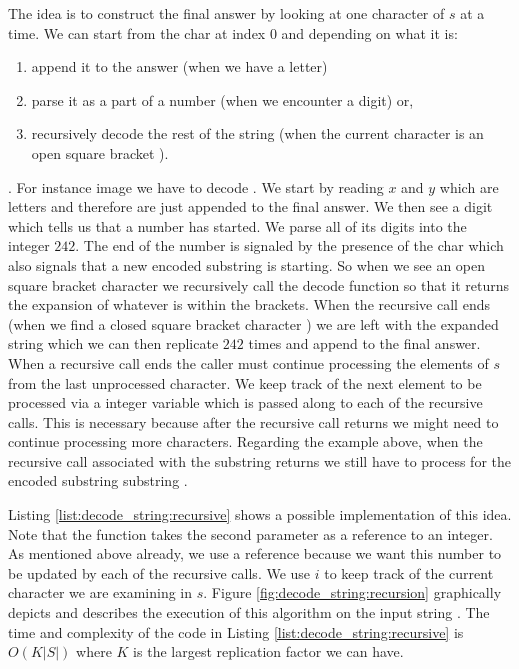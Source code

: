 The idea is to construct the final answer by looking at one character of $s$ at a time. We can start
from  the char at index $0$ and depending on what it is:
\begin{enumerate}
	\item append it to the answer (when we have a letter)
	\item parse it as a part of a number (when we encounter a digit) or,
	\item recursively decode the rest of the string (when the current character is an open square
		  bracket \inline{'['}).
\end{enumerate}.
For instance image we have to decode .
We start by reading $x$ and $y$ which are letters and therefore are
just appended to the final answer.
We then see a digit which tells us that a number has started. 
We parse all of its digits into the integer $242$.
The end of the number is signaled by the presence of the char
\inline{'['} which also signals that a new encoded substring is starting.
So when we see an open
square bracket character we recursively call the decode function so that it returns the expansion of
whatever is within the brackets.
When the recursive call ends (when we find a closed square bracket
character \inline{']'}) we are left with the expanded string which we can then replicate $242$ times
and append to the final answer.
When a recursive call ends the caller must continue processing the elements of $s$ from the last unprocessed character.
We keep track of the next element to be processed via a integer variable which is passed along to each of the recursive calls.
This is necessary because after the
recursive call returns we might need to continue processing more characters. Regarding the example above, when the recursive call 
associated with the substring  returns we still have to process  for the encoded substring substring 
.

Listing \ref{list:decode_string:recursive} shows a possible implementation of this idea. 
Note that the function  takes the second parameter 
as a reference to an integer.
As mentioned above already, we use a reference because we want this number 
to be updated by each of the recursive calls.
We use $i$ to keep track of the current character we are examining in $s$. 
Figure \ref{fig:decode_string:recursion} graphically depicts and describes the execution 
of this algorithm  on the input string .
The time and complexity of the code in Listing \ref{list:decode_string:recursive} is $O(K|S|)$ where $K$ is the largest replication factor we can have.

